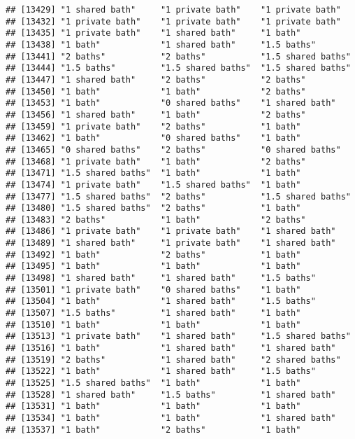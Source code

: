 \documentclass[
]{article}
\begin{document}
\begin{verbatim}
## [13429] "1 shared bath"     "1 private bath"    "1 private bath"   
## [13432] "1 private bath"    "1 private bath"    "1 private bath"   
## [13435] "1 private bath"    "1 shared bath"     "1 bath"           
## [13438] "1 bath"            "1 shared bath"     "1.5 baths"        
## [13441] "2 baths"           "2 baths"           "1.5 shared baths" 
## [13444] "1.5 baths"         "1.5 shared baths"  "1.5 shared baths" 
## [13447] "1 shared bath"     "2 baths"           "2 baths"          
## [13450] "1 bath"            "1 bath"            "2 baths"          
## [13453] "1 bath"            "0 shared baths"    "1 shared bath"    
## [13456] "1 shared bath"     "1 bath"            "2 baths"          
## [13459] "1 private bath"    "2 baths"           "1 bath"           
## [13462] "1 bath"            "0 shared baths"    "1 bath"           
## [13465] "0 shared baths"    "2 baths"           "0 shared baths"   
## [13468] "1 private bath"    "1 bath"            "2 baths"          
## [13471] "1.5 shared baths"  "1 bath"            "1 bath"           
## [13474] "1 private bath"    "1.5 shared baths"  "1 bath"           
## [13477] "1.5 shared baths"  "2 baths"           "1.5 shared baths" 
## [13480] "1.5 shared baths"  "2 baths"           "1 bath"           
## [13483] "2 baths"           "1 bath"            "2 baths"          
## [13486] "1 private bath"    "1 private bath"    "1 shared bath"    
## [13489] "1 shared bath"     "1 private bath"    "1 shared bath"    
## [13492] "1 bath"            "2 baths"           "1 bath"           
## [13495] "1 bath"            "1 bath"            "1 bath"           
## [13498] "1 shared bath"     "1 shared bath"     "1.5 baths"        
## [13501] "1 private bath"    "0 shared baths"    "1 bath"           
## [13504] "1 bath"            "1 shared bath"     "1.5 baths"        
## [13507] "1.5 baths"         "1 shared bath"     "1 bath"           
## [13510] "1 bath"            "1 bath"            "1 bath"           
## [13513] "1 private bath"    "1 shared bath"     "1.5 shared baths" 
## [13516] "1 bath"            "1 shared bath"     "1 shared bath"    
## [13519] "2 baths"           "1 shared bath"     "2 shared baths"   
## [13522] "1 bath"            "1 shared bath"     "1.5 baths"        
## [13525] "1.5 shared baths"  "1 bath"            "1 bath"           
## [13528] "1 shared bath"     "1.5 baths"         "1 shared bath"    
## [13531] "1 bath"            "1 bath"            "1 bath"           
## [13534] "1 bath"            "1 bath"            "1 shared bath"    
## [13537] "1 bath"            "2 baths"           "1 bath"           

\end{verbatim}
\end{document}
